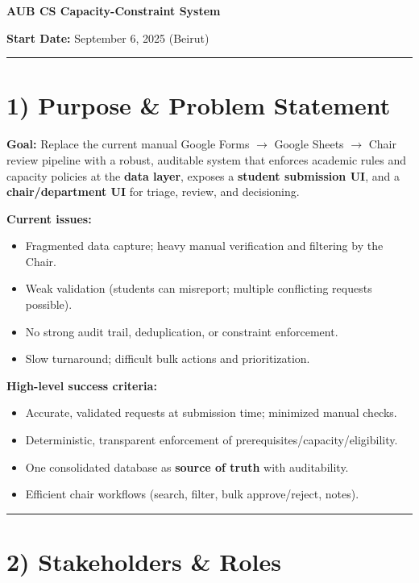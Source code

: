 \documentclass[12pt,a4paper]{article}
\begin{document}
\begin{center}
  {\LARGE \textbf{AUB CS Capacity-Constraint System}}\\[0.5em]
\end{center}

\textbf{Start Date:} September 6, 2025 (Beirut) \\

\hrule

\section*{1) Purpose \& Problem Statement}

\textbf{Goal:} Replace the current manual Google Forms $\rightarrow$ Google Sheets $\rightarrow$ Chair review pipeline with a robust, auditable system that enforces academic rules and capacity policies at the \textbf{data layer}, exposes a \textbf{student submission UI}, and a \textbf{chair/department UI} for triage, review, and decisioning.

\textbf{Current issues:}
\begin{itemize}
  \item Fragmented data capture; heavy manual verification and filtering by the Chair.
  \item Weak validation (students can misreport; multiple conflicting requests possible).
  \item No strong audit trail, deduplication, or constraint enforcement.
  \item Slow turnaround; difficult bulk actions and prioritization.
\end{itemize}

\textbf{High-level success criteria:}
\begin{itemize}
  \item Accurate, validated requests at submission time; minimized manual checks.
  \item Deterministic, transparent enforcement of prerequisites/capacity/eligibility.
  \item One consolidated database as \textbf{source of truth} with auditability.
  \item Efficient chair workflows (search, filter, bulk approve/reject, notes).
\end{itemize}

\hrule

\section*{2) Stakeholders \& Roles}
\end{document}
